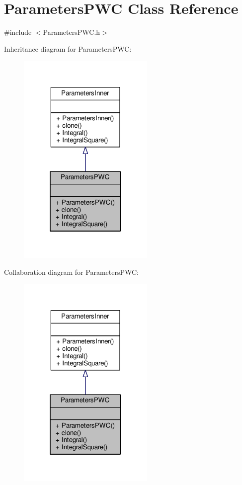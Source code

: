 \hypertarget{classParametersPWC}{}\section{Parameters\+P\+WC Class Reference}
\label{classParametersPWC}


{\ttfamily \#include $<$Parameters\+P\+W\+C.\+h$>$}



Inheritance diagram for Parameters\+P\+WC\+:
\nopagebreak
\begin{figure}[H]
\begin{center}
\leavevmode
\includegraphics[width=186pt]{classParametersPWC__inherit__graph}
\end{center}
\end{figure}


Collaboration diagram for Parameters\+P\+WC\+:
\nopagebreak
\begin{figure}[H]
\begin{center}
\leavevmode
\includegraphics[width=186pt]{classParametersPWC__coll__graph}
\end{center}
\end{figure}

